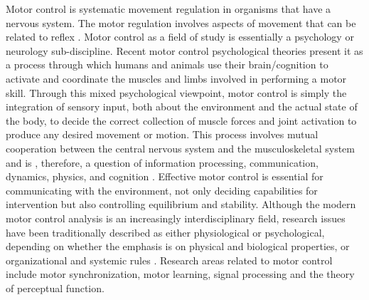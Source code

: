 Motor control is systematic movement regulation in organisms that have a nervous system. 
The motor regulation involves aspects of movement that can be related to reflex \cite{wolff1964behavioural}. 
Motor control as a field of study is essentially a psychology or neurology sub-discipline.
Recent motor control psychological theories present it as a process through which humans 
and animals use their brain/cognition to activate and coordinate the muscles and limbs 
involved in performing a motor skill. Through this mixed psychological viewpoint, motor 
control is simply the integration of sensory input, both about the environment and the 
actual state of the body, to decide the correct collection of muscle forces and joint 
activation to produce any desired movement or motion. This process involves mutual 
cooperation between the central nervous system and the musculoskeletal system and is 
, therefore, a question of information processing, communication, dynamics, physics, and 
cognition \cite{pierno2008robotic, tang2011enhancing}. Effective motor control is essential 
for communicating with the environment, not only deciding capabilities for intervention 
but also controlling equilibrium and stability. Although the modern motor control analysis 
is an increasingly interdisciplinary field, research issues have been traditionally 
described as either physiological or psychological, depending on whether the emphasis 
is on physical and biological properties, or organizational and systemic rules \cite{villano2011domer}.
Research areas related to motor control include motor synchronization, motor learning, 
signal processing and the theory of perceptual function.\\

